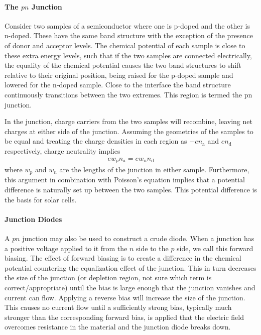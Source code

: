 \paragraph{The $pn$ Junction}
Consider two samples of a semiconductor where one is p-doped and the other is n-doped. These have the same band structure with the exception of the presence of donor and acceptor levels. The chemical potential of each sample is close to these extra energy levels, such that if the two samples are connected electrically, the equality of the chemical potential causes the two band structures to shift relative to their original position, being raised for the p-doped sample and lowered for the n-doped sample. Close to the interface the band structure continuously transitions between the two extremes. This region is termed the pn junction.

In the junction, charge carriers from the two samples will recombine, leaving net charges at either side of the junction. Assuming the geometries of the samples to be equal and treating the charge densities in each region as $-en_{\text{a}}$ and $en_{\text{d}}$ respectively, charge neutrality implies
\begin{align*}
	ew_{p}n_{\text{a}} = ew_{n}n_{\text{d}}
\end{align*}
where $w_{p}$ and $w_{n}$ are the lengths of the junction in either sample. Furthermore, this argument in combination with Poisson's equation implies that a potential difference is naturally set up between the two samples. This potential difference is the basis for solar cells.

\paragraph{Junction Diodes}
A $pn$ junction may also be used to construct a crude diode. When a junction has a positive voltage applied to it from the $n$ side to the $p$ side, we call this forward biasing. The effect of forward biasing is to create a difference in the chemical potential countering the equalization effect of the junction. This in turn decreases the size of the junction (or depletion region, not sure which term is correct/appropriate) until the bias is large enough that the junction vanishes and current can flow. Applying a reverse bias will increase the size of the junction. This causes no current flow until a sufficiently strong bias, typically much stronger than the corresponding forward bias, is applied that the electric field overcomes resistance in the material and the junction diode breaks down.


